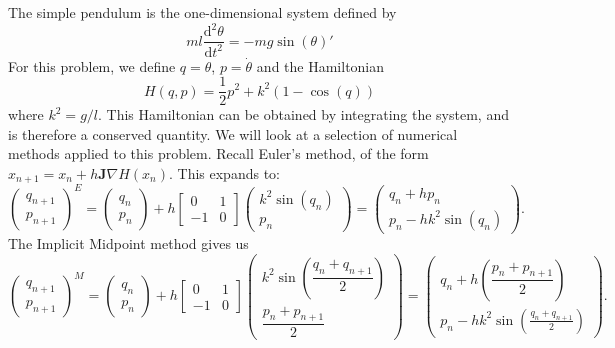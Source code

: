 \documentclass{report}
\theoremstyle{exampstyle} \newtheorem{example}[theorem]{Example}
\theoremstyle{exampstyle} \newtheorem{remark}[theorem]{Remark}
\theoremstyle{exampstyle} \newtheorem{definition}[theorem]{Definition}
\theoremstyle{exampstyle} \newtheorem{lemma}[theorem]{Lemma}
\begin{document}
The simple pendulum is the one-dimensional system defined by
\begin{equation*}
	ml\frac{\mathrm{d}^2 \theta}{\mathrm{d}t^2} = - mg \sin(\theta)'
\end{equation*}
For this problem, we define $q = \theta$, $p = \dot{\theta}$ and the Hamiltonian
\begin{equation*}
	H(q,p) = \frac{1}{2}p^2 + k^2(1-\cos(q))
\end{equation*}
where $k^2 = g/l$.
This Hamiltonian can be obtained by integrating the system, and is therefore a conserved quantity.
We will look at a selection of numerical methods applied to this problem.
Recall Euler's method, of the form $x_{n+1} = x_n + h \mathbf{J} \nabla H(x_n)$. This expands to:
\begin{equation*}
	\begin{pmatrix}
		q_{n+1} \\
		p_{n+1}
	\end{pmatrix}^E = \begin{pmatrix}
		q_n \\
		p_n
	\end{pmatrix} + h \begin{bmatrix}
		0 & 1 \\
		-1 & 0
	\end{bmatrix} \begin{pmatrix}
		k^2 \sin(q_n) \\
		p_n
	\end{pmatrix} = \begin{pmatrix}
		q_n + h p_n \\
		p_n - h k^2 \sin(q_n)
	\end{pmatrix}.
\end{equation*}
The Implicit Midpoint method gives us
\begin{equation*}
	\begin{pmatrix}
		q_{n+1} \\
		p_{n+1}
	\end{pmatrix}^M = \begin{pmatrix}
		q_n \\
		p_n
	\end{pmatrix} + h \begin{bmatrix}
		0 & 1 \\
		-1 & 0
	\end{bmatrix} \begin{pmatrix}
		k^2 \sin \left(\dfrac{q_n + q_{n+1}}{2}\right) \\
		\dfrac{p_n + p_{n+1}}{2}
	\end{pmatrix} = \begin{pmatrix}
		q_n + h \left( \dfrac{p_n + p_{n+1}}{2} \right) \\
		p_n - h k^2 \sin \left( \frac{q_n + q_{n+1}}{2} \right)
	\end{pmatrix}.
\end{equation*}
\end{document}
